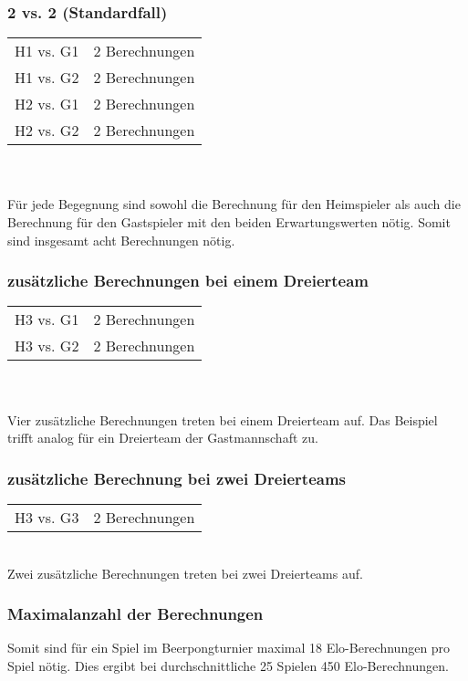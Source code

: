 \documentclass[a4paper, 12pt]{article}
\begin{document}
\subsubsection{2 vs. 2 (Standardfall)}
\begin{tabular}[h]{ll}
H1 vs. G1 & 2 Berechnungen \\
H1 vs. G2 & 2 Berechnungen \\
H2 vs. G1 & 2 Berechnungen \\
H2 vs. G2 & 2 Berechnungen \\
\end{tabular}
\\
\\Für jede Begegnung sind sowohl die Berechnung für den Heimspieler als auch die Berechnung für den Gastspieler mit den beiden Erwartungswerten nötig. Somit sind insgesamt acht Berechnungen nötig.

\subsubsection{zusätzliche Berechnungen bei einem Dreierteam}
\begin{tabular}[h]{ll}
H3 vs. G1 & 2 Berechnungen \\
H3 vs. G2 & 2 Berechnungen \\
\end{tabular}
\\
\\Vier zusätzliche Berechnungen treten bei einem Dreierteam auf. Das Beispiel trifft analog für ein Dreierteam der Gastmannschaft zu.
\subsubsection{zusätzliche Berechnung bei zwei Dreierteams}
\begin{tabular}[h]{ll}
H3 vs. G3 & 2 Berechnungen \\
\end{tabular}
\\Zwei zusätzliche Berechnungen treten bei zwei Dreierteams auf.
\subsubsection{Maximalanzahl der Berechnungen}
Somit sind für ein Spiel im Beerpongturnier maximal 18 Elo-Berechnungen pro Spiel nötig. Dies ergibt bei durchschnittliche 25 Spielen 450 Elo-Berechnungen.
\end{document}
